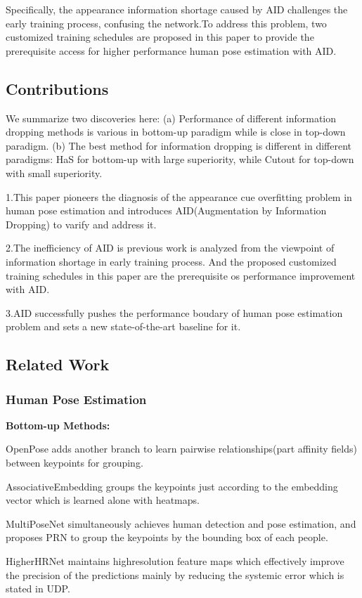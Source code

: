 \documentclass[11pt]{article}
\begin{document}
Specifically, the appearance information shortage caused by AID challenges the early training process, confusing the network.To address this problem, two customized training schedules are proposed in this paper to provide the prerequisite access for
higher performance human pose estimation with AID.

\subsection{Contributions}
We summarize two discoveries here: 
\noindent(a) Performance of different information dropping methods is various in bottom-up paradigm while is close in top-down paradigm.
\noindent(b) The best method for information dropping is different in different paradigms: HaS for bottom-up with large superiority, while Cutout for top-down with small superiority.

\noindent1.This paper pioneers the diagnosis of the appearance cue overfitting problem in human pose estimation and introduces AID(Augmentation by Information Dropping) to varify and address it.

\noindent2.The inefficiency of AID is previous work is analyzed from the viewpoint of information shortage in early training process. And the proposed customized training schedules in this paper are the prerequisite os performance improvement with AID.

\noindent3.AID successfully pushes the performance boudary of human pose estimation problem and sets a new state-of-the-art baseline for it.
\subsection{Related Work}
\subsubsection{Human Pose Estimation}
\textbf{Bottom-up Methods:}

OpenPose adds another branch to learn pairwise relationships(part affinity fields) between keypoints for grouping.

AssociativeEmbedding groups the keypoints just according to the embedding vector which is learned alone with heatmaps.

MultiPoseNet simultaneously achieves human detection and pose estimation, and proposes PRN to group the keypoints by the bounding box of each people.

HigherHRNet maintains highresolution feature maps which effectively improve the precision of the predictions mainly by reducing the systemic error which is stated in UDP.
\end{document}
